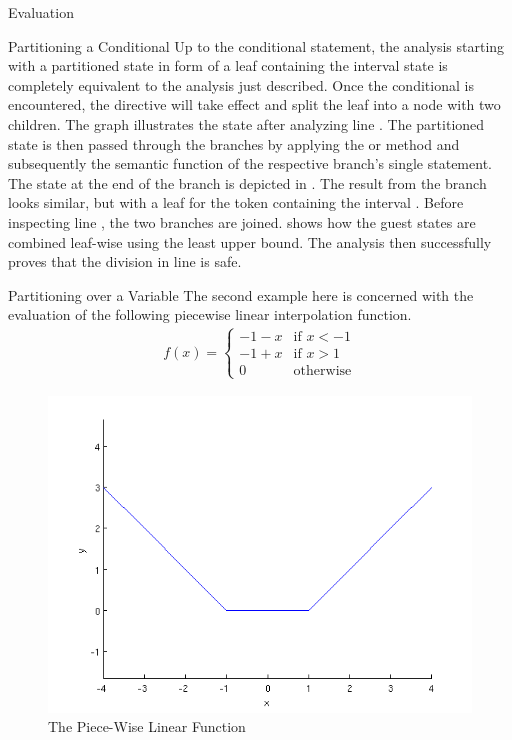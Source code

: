 \begin{chapter}{Evaluation}
\begin{section}{Partitioning a Conditional}
		Up to the conditional statement, the analysis starting with a partitioned state in form of a leaf containing the interval state is completely equivalent to the analysis just described. Once the conditional is encountered, the directive will take effect and split the leaf into a node with two children. The graph \one illustrates the state after analyzing line . The partitioned state is then passed through the branches by applying the  or  method and subsequently the semantic function of the respective branch's single statement. The state at the end of the  branch is depicted in \two. The result from the  branch looks similar, but with a leaf for the  token containing the interval \code{[-1,-1]}. Before inspecting line , the two branches are joined. \three shows how the guest states are combined leaf-wise using the least upper bound. The analysis then successfully proves that the division in line  is safe.
	\end{section}


	\begin{section}{Partitioning over a Variable}
		The second example here is concerned with the evaluation of the following piecewise linear interpolation function.
		\begin{align}
			f(x) = 
				\begin{cases}
					-1 - x & \text{if } x < -1 \\
					-1 + x & \text{if } x > 1 \\
					0 & \text{otherwise}
				\end{cases}
		\end{align}

		\begin{figure}
			\centering
			\includegraphics[scale=0.7]{Plots/valueExample.png}
			\caption{The Piece-Wise Linear Function}
			\label{figure:valueExample}
		\end{figure}


\end{section}
\end{chapter}
